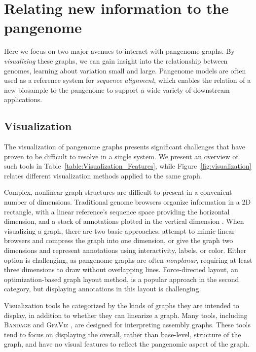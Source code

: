 \section{Relating new information to the pangenome}
\label{sec:relating}

Here we focus on two major avenues to interact with pangenome graphs.
By \emph{visualizing} these graphs, we can gain insight into the relationship between genomes, learning about variation small and large.
Pangenome models are often used as a reference system for \emph{sequence alignment}, which enables the relation of a new biosample to the pangenome to support a wide variety of downstream applications.

\subsection{Visualization}

\label{sec:viz}


The visualization of pangenome graphs presents significant challenges that have proven to be difficult to resolve in a single system.
We present an overview of such tools in Table~\ref{table:Visualization_Features}, while Figure~\ref{fig:visualization} relates different visualization methods applied to the same graph.

Complex, nonlinear graph structures are difficult to present in a convenient number of dimensions.
Traditional genome browsers organize information in a 2D rectangle, with a linear reference's sequence space providing the horizontal dimension, and a stack of annotations plotted in the vertical dimension \cite{Haeussler_2018}.
When visualizing a graph, there are two basic approaches: attempt to mimic linear browsers and compress the graph into one dimension, or give the graph two dimensions and represent annotations using interactivity, labels, or color.
Either option is challenging, as pangenome graphs are often \emph{nonplanar}, requiring at least three dimensions to draw without overlapping lines.
Force-directed layout, an optimization-based graph layout method, is a popular approach in the second category, but displaying annotations in this layout is challenging.

Visualization tools be categorized by the kinds of graphs they are intended to display, in addition to whether they can linearize a graph.
Many tools, including \textsc{Bandage} \citep{Wick_2015} and \textsc{GfaViz} \cite{Gonnella_2018}, are designed for interpreting assembly graphs. 
These tools tend to focus on displaying the overall, rather than base-level, structure of the graph, and have no visual features to reflect the pangenomic aspect of the graph.

